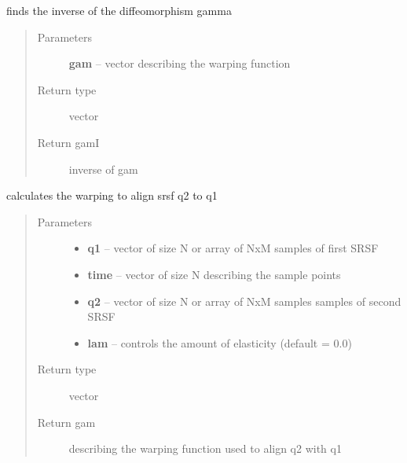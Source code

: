 \documentclass[letterpaper,10pt,english]{sphinxmanual}
\begin{document}

\begin{fulllineitems}
\label{utility_functions:utility_functions.invertGamma}
finds the inverse of the diffeomorphism gamma
\begin{quote}\begin{description}
\item[{Parameters}] \leavevmode
\textbf{gam} -- vector describing the warping function

\item[{Return type}] \leavevmode
vector

\item[{Return gamI}] \leavevmode
inverse of gam

\end{description}\end{quote}

\end{fulllineitems}


\begin{fulllineitems}
\label{utility_functions:utility_functions.optimum_reparam}
calculates the warping to align srsf q2 to q1
\begin{quote}\begin{description}
\item[{Parameters}] \leavevmode\begin{itemize}
\item {} 
\textbf{q1} -- vector of size N or array of NxM samples of first SRSF

\item {} 
\textbf{time} -- vector of size N describing the sample points

\item {} 
\textbf{q2} -- vector of size N or array of NxM samples samples of second SRSF

\item {} 
\textbf{lam} -- controls the amount of elasticity (default = 0.0)

\end{itemize}

\item[{Return type}] \leavevmode
vector

\item[{Return gam}] \leavevmode
describing the warping function used to align q2 with q1

\end{description}\end{quote}

\end{fulllineitems}
\end{document}
